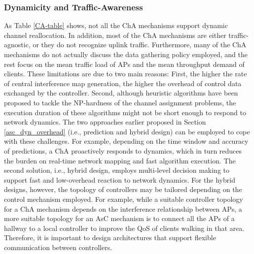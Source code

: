 \subsubsection{\textbf{Dynamicity and Traffic-Awareness}}
\label{asc_dyn_tra_awar}
As Table \ref{CA-table} shows, not all the ChA mechanisms support dynamic channel reallocation.
In addition, most of the ChA mechanisms are either traffic-agnostic, or they do not recognize uplink traffic.
Furthermore, many of the ChA mechanisms do not actually discuss the data gathering policy employed, and the rest focus on the mean traffic load of APs and the mean throughput demand of clients. 
These limitations are due to two main reasons: First, the higher the rate of central interference map generation, the higher the overhead of control data exchanged by the controller. 
Second, although heuristic algorithms have been proposed to tackle the NP-hardness of the channel assignment problems, the execution duration of these algorithms might not be short enough to respond to network dynamics.
The two approaches earlier proposed in Section \ref{asc_dyn_overhead} (i.e., prediction and hybrid design) can be employed to cope with these challenges.
For example, depending on the time window and accuracy of predictions, a ChA proactively responds to dynamics, which in turn reduces the burden on real-time network mapping and fast algorithm execution.
The second solution, i.e., hybrid design, employs multi-level decision making to support fast and low-overhead reaction to network dynamics. 
For the hybrid designs, however, the topology of controllers may be tailored depending on the control mechanism employed.
For example, while a suitable controller topology for a ChA mechanism depends on the interference relationship between APs, a more suitable topology for an AsC mechanism is to connect all the APs of a hallway to a local controller to improve the QoS of clients walking in that area.
Therefore, it is important to design architectures that support flexible communication between controllers.



